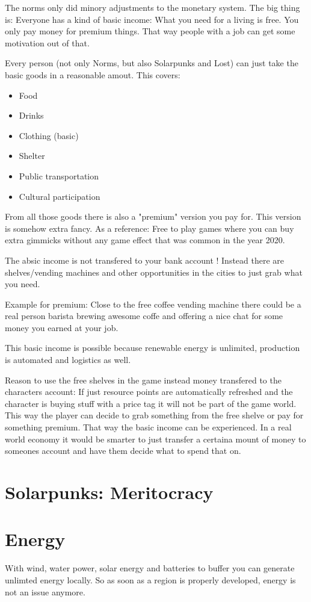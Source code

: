 The norms only did minory adjustments to the monetary system. The big thing is: Everyone has a kind of basic income: What you need for a living is free.
You only pay money for premium things. That way people with a job can get some motivation out of that.

Every person (not only Norms, but also Solarpunks and Lost) can just take the basic goods in a reasonable amout. This covers:

\begin{itemize}
    \item Food
    \item Drinks
    \item Clothing (basic)
    \item Shelter
    \item Public transportation
    \item Cultural participation
\end{itemize}

From all those goods there is also a "premium" version you pay for. This version is somehow extra fancy. As a reference: Free to play games where you can buy extra gimmicks without any game effect that was common in the year 2020.

The absic income is not transfered to your bank account ! Instead there are shelves/vending machines and other opportunities in the cities to just grab what you need.

Example for premium: Close to the free coffee vending machine there could be a real person barista brewing awesome coffe and offering a nice chat for some money you earned at your job.

This basic income is possible because renewable energy is unlimited, production is automated and logistics as well.

\begin{reason}[]
    Reason to use the free shelves in the game instead money transfered to the characters account: If just resource points are automatically refreshed and the character is buying stuff with a price tag it will not be part of the game world. This way the player can decide to grab something from the free shelve or pay for something premium. That way the basic income can be experienced. In a real world economy it would be smarter to just transfer a certaina mount of money to someones account and have them decide what to spend that on.
\end{reason}

\section{Solarpunks: Meritocracy}



\section{Energy}

With wind, water power, solar energy and batteries to buffer you can generate unlimted energy locally. So as soon as a region is properly developed, energy is not an issue anymore.
